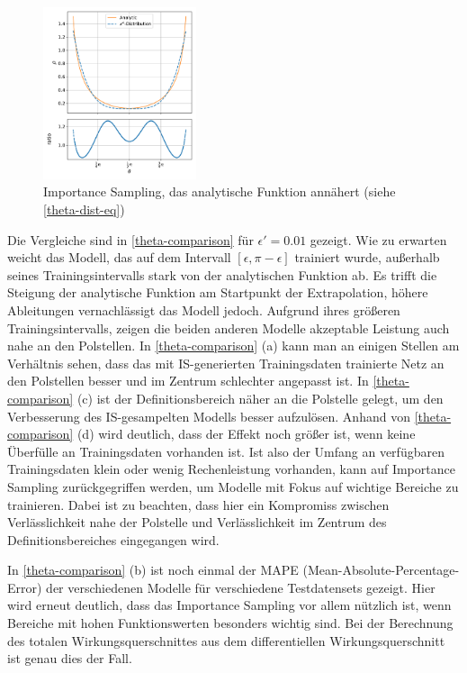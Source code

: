 \begin{figure}
	\centering
	\includegraphics[width=0.4\textwidth]{graphics/4}
	\caption{Importance Sampling, das analytische Funktion annähert (siehe \textsf{\autoref{theta-dist-eq}})}
	\label{theta-dist}
\end{figure}
Die Vergleiche sind in \textsf{\autoref{theta-comparison}} für $\epsilon' = 0.01$ gezeigt. Wie zu erwarten weicht das Modell, das auf dem Intervall $[\epsilon, \pi-\epsilon]$ trainiert wurde, außerhalb seines Trainingsintervalls stark von der analytischen Funktion ab. Es trifft die Steigung der analytische Funktion am Startpunkt der Extrapolation, höhere Ableitungen vernachlässigt das Modell jedoch. Aufgrund ihres größeren Trainingsintervalls, zeigen die beiden anderen Modelle akzeptable Leistung auch nahe an den Polstellen. In \textsf{\autoref{theta-comparison} (a)} kann man an einigen Stellen am Verhältnis sehen, dass das mit IS-generierten Trainingsdaten trainierte Netz an den Polstellen besser und im Zentrum schlechter angepasst ist. In \textsf{\autoref{theta-comparison} (c)}  ist der Definitionsbereich näher an die Polstelle gelegt, um den Verbesserung des IS-gesampelten Modells besser aufzulösen. Anhand von \textsf{\autoref{theta-comparison} (d)}  wird deutlich, dass der Effekt noch größer ist, wenn keine Überfülle an Trainingsdaten vorhanden ist. Ist also der Umfang an verfügbaren Trainingsdaten klein oder wenig Rechenleistung vorhanden, kann auf Importance Sampling zurückgegriffen werden, um Modelle mit Fokus auf wichtige Bereiche zu trainieren. Dabei ist zu beachten, dass hier ein Kompromiss zwischen Verlässlichkeit nahe der Polstelle und Verlässlichkeit im Zentrum des Definitionsbereiches eingegangen wird.

In \textsf{\autoref{theta-comparison} (b)} ist noch einmal der MAPE (Mean-Absolute-Percentage-Error) der verschiedenen Modelle für verschiedene Testdatensets gezeigt. Hier wird erneut deutlich, dass das Importance Sampling vor allem nützlich ist, wenn Bereiche mit hohen Funktionswerten besonders wichtig sind. Bei der Berechnung des totalen Wirkungsquerschnittes aus dem differentiellen Wirkungsquerschnitt ist genau dies der Fall.

